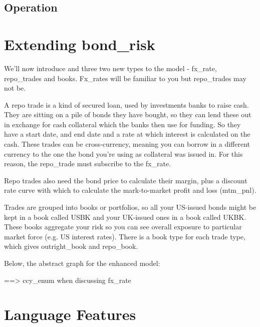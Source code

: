 \documentclass{report}
\begin{document}
\section{Operation}

\chapter{Extending bond_risk}

We'll now introduce and three two new types to the model - fx_rate, repo_trades and books. Fx_rates will be 
familiar to you but repo_trades may not be.

A repo trade is a kind of secured loan, used by investments banks to raise cash. They are sitting on a pile of bonds they have bought, so they can lend these out in exchange for cash collateral which the banks then use for funding. So they have a start date, and end date and a rate at which interest is calculated on the cash. These trades can be cross-currency, meaning you can borrow in a different currency to the one the bond you're using as collateral was issued in. For this reason, the repo_trade must subscribe to the fx_rate. 

Repo trades also need the bond price to calculate their margin, plus a discount rate curve with which to 
calculate the mark-to-market profit and loss (mtm_pnl).

Trades are grouped into books or portfolios, so all your US-issued bonds might be kept in a book called USBK and your UK-issued ones in a book called UKBK. These books aggregate your risk so you can see overall exposure to particular market force (e.g. US interest rates). There is a book type for each trade type, which gives outright_book and repo_book.

Below, the abstract graph for the enhanced model:












==> ccy_enum when discussing fx_rate


\chapter{Language Features}
\label{sec:Language Features}
\end{document}
